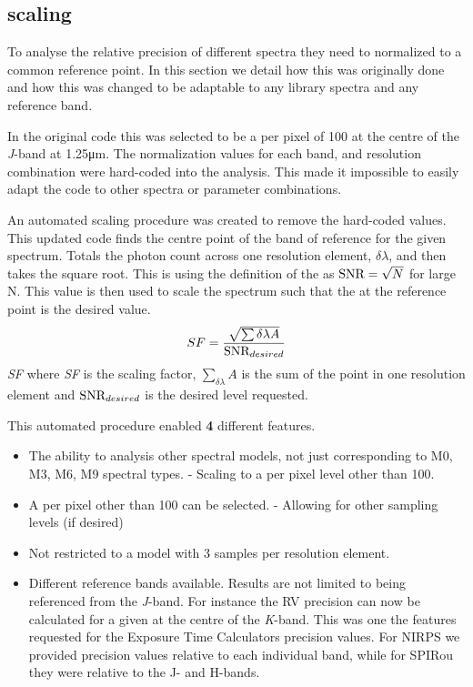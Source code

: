 \subsection{\snr{} scaling}
\label{subsec:snr_scaling}
To analyse the relative precision of different spectra they need to normalized to a common reference point.
In this section we detail how this was originally done and how this was changed to be adaptable to any library spectra and any reference band.

In the original code this was selected to be a \snr{} per pixel of 100 at the centre of the \textit{J}-band at 1.25\si{\micro\meter}.
The normalization values for each band, \Vsini{} and resolution combination were hard-coded into the analysis.
This made it impossible to easily adapt the code to other spectra or parameter combinations.

An automated \snr{} scaling procedure was created to remove the hard-coded values.
This updated code finds the centre point of the band of reference for the given spectrum.
Totals the photon count across one resolution element, \(\delta\lambda\), and then takes the square root.
This is using the definition of the \snr{} as \(\textrm{SNR}{} = \sqrt{N}\) for large N.
This value is then used to scale the spectrum such that the \snr{} at the reference point is the desired value.
\begin{equation}
    SF =  \frac{\sqrt{\sum{\delta\lambda} A}} {\textrm{SNR}{}_{desired}}
\end{equation}
\textit{SF} where \textit{SF} is the scaling factor, \(\sum_{\delta\lambda} A\) is the sum of the point in one resolution element and \({\textrm{SNR}{}}_{desired}\) is the desired \snr{} level requested.

This automated procedure enabled {\red{}\textbf{4}} different features.
\begin{itemize}
    \setlength\itemsep{-0.3em} %
    \item The ability to analysis other spectral models, not just corresponding to {M0}, {M3}, {M6}, {M9} spectral types.
    - Scaling to a \snr{} per pixel level other than 100.
    \item A \snr{} per pixel other than 100 can be selected.
    - Allowing for other sampling levels (if desired)
    \item Not restricted to a model with 3 samples per resolution element.
    \item Different reference bands available.
    Results are not limited to being referenced from the \textit{J}-band.
    For instance the {RV} precision can now be calculated for a given \snr{} at the centre of the \textit{K}-band.
    This was one the features requested for the Exposure Time Calculators precision values.
    For {NIRPS} we provided precision values relative to each individual band, while for {SPIRou} they were relative to the {J}- and {H}-bands.
\end{itemize}

